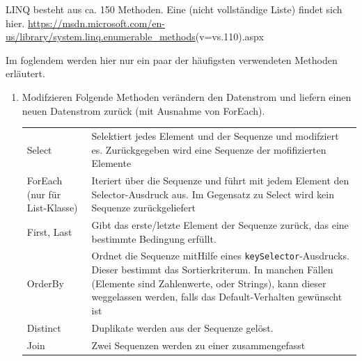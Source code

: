 \documentclass[11pt]{article}
\begin{document}
LINQ besteht aus ca. 150 Methoden.
Eine (nicht vollständige Liste) findet sich hier.
\url{https://msdn.microsoft.com/en-us/library/system.linq.enumerable_methods}(v=vs.110).aspx

Im foglendem werden hier nur ein paar der häufigsten verwendeten Methoden erläutert.

\begin{enumerate}
\item Modifzieren
\label{sec:orgheadline42}
Folgende Methoden verändern den Datenstrom und liefern einen neuen Datenstrom
zurück (mit Ausnahme von ForEach).
\begin{center}
\begin{tabular}{ll}
Select & Selektiert jedes Element und der Sequenze und modifziert es. Zurückgegeben wird eine Sequenze der mofifizierten Elemente\\
ForEach (nur für List-Klasse) & Iteriert über die Sequenze und führt mit jedem Element den Selector-Ausdruck aus. Im Gegensatz zu Select wird kein Sequenze zurückgeliefert\\
First,  Last & Gibt das erste/letzte Element der Sequenze zurück, das eine bestimmte Bedingung erfüllt.\\
OrderBy & Ordnet die Sequenze mitHilfe eines \texttt{keySelector}-Ausdrucks. Dieser bestimmt das Sortierkriterum. In manchen Fällen (Elemente sind Zahlenwerte, oder Strings), kann dieser weggelassen werden, falls das Default-Verhalten gewünscht ist\\
Distinct & Duplikate werden aus der Sequenze gelöst.\\
Join & Zwei Sequenzen werden zu einer zusammengefasst\\
\end{tabular}
\end{center}


\end{enumerate}
\end{document}
